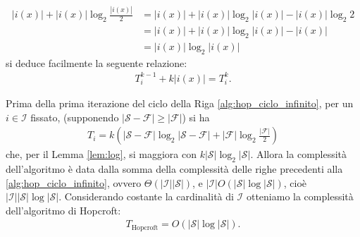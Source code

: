 \begin{proof2}
\begin{itemize}
        \begin{align*}
            |i(x)| + |i(x)|\log_2 \frac{|i(x)|}{2} &= |i(x)| + |i(x)|\log_2 |i(x)| - |i(x)|\log_2 2\\
            &= |i(x)| + |i(x)|\log_2 |i(x)| - |i(x)|\\
            &= |i(x)|\log_2 |i(x)|
        \end{align*}
        si deduce facilmente la seguente relazione:
        \begin{gather*}
            T_i^{k-1} + k|i(x)| = T_i^k.
        \end{gather*}
    \end{itemize}
    \vspace*{-0.8cm}
\end{proof2}

Prima della prima iterazione del ciclo della Riga \ref{alg:hop_ciclo_infinito}, per un $i \in \mathcal{I}$ fissato, (supponendo $|\mathcal{S}-\mathcal{F}| \geq |\mathcal{F}|$) si ha
\begin{gather*}
    T_i = k\left(|\mathcal{S} - \mathcal{F}|\log_2|\mathcal{S} - \mathcal{F}| + |\mathcal{F}|\log_2\frac{|\mathcal{F}|}{2}\right)
\end{gather*}
che, per il Lemma \ref{lem:log}, si maggiora con $k |\mathcal{S}|\log_2|\mathcal{S}|$. Allora la complessità dell'algoritmo è data dalla somma della complessità delle righe precedenti alla \ref{alg:hop_ciclo_infinito}, ovvero $\Theta(|\mathcal{I}||\mathcal{S}|)$, e $|\mathcal{I}|O(|\mathcal{S}|\log|\mathcal{S}|)$, cioè $|\mathcal{I}||\mathcal{S}|\log|\mathcal{S}|$. Considerando costante la cardinalità di $\mathcal{I}$ otteniamo la complessità dell'algoritmo di Hopcroft:
\begin{gather*}
    T_{\text{Hopcroft}} = O(|\mathcal{S}|\log|\mathcal{S}|).
\end{gather*}
